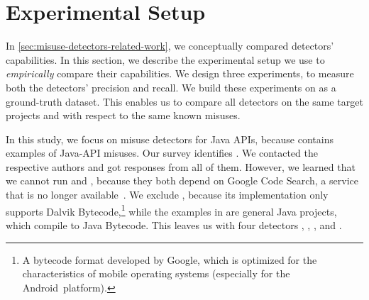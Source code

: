 


\section{Experimental Setup}
\label{sec:benchmark}


In \autoref{sec:misuse-detectors-related-work}, we conceptually compared detectors' capabilities.
In this section, we describe the experimental setup we use to \textit{empirically} compare their capabilities.
We design three experiments, to measure both the detectors' precision and recall.
We build these experiments on \MUBench as a ground-truth dataset.
This enables us to compare all detectors on the same target projects and with respect to the same known misuses.

In this study, we focus on misuse detectors for Java APIs, because \MUBench contains examples of Java-API misuses.
Our survey identifies .
We contacted the respective authors and got responses from all of them.
However, we learned that we cannot run \CARMiner{} and \Alattin{}, because they both depend on Google Code Search, a service that is no longer available~\cite{farewellGoogle}.
We exclude \DroidAssist{}, because its implementation only supports Dalvik Bytecode,\footnote{A bytecode format developed by Google, which is optimized for the characteristics of mobile operating systems (especially for the Android~platform).} while the examples in \MUBench are general Java projects, which compile to Java Bytecode.
This leaves us with four detectors \Jadet{}, \GROUMiner{}, \Tikanga{}, and \DMMC{}.

